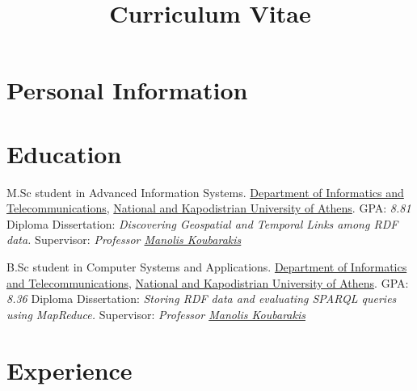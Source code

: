 \documentclass[11pt,a4paper,roman]{moderncv} %
\title{Curriculum Vitae}
\begin{document}
\makecvtitle %




\section{Personal Information}





\section{Education}

{M.Sc student in Advanced Information Systems.}
{\href{http://www.di.uoa.gr/eng}{Department of Informatics and Telecommunications}, \href{http://en.uoa.gr}{National and Kapodistrian University of Athens}.}
{GPA: \emph{8.81}}
{Diploma Dissertation: \emph{Discovering Geospatial and Temporal Links among RDF data.}}
{Supervisor: \emph{Professor \href{http://cgi.di.uoa.gr/~koubarak/}{Manolis Koubarakis}}}
{\newline}

{B.Sc student in Computer Systems and Applications.}
{\href{http://www.di.uoa.gr/eng}{Department of Informatics and Telecommunications}, \href{http://en.uoa.gr}{National and Kapodistrian University of Athens}.}
{GPA: \emph{8.36}}
{Diploma Dissertation: \emph{Storing RDF data and evaluating SPARQL queries using MapReduce.}}
{Supervisor: \emph{Professor \href{http://cgi.di.uoa.gr/~koubarak/}{Manolis Koubarakis}}}
{}




\section{Experience}
\end{document}
